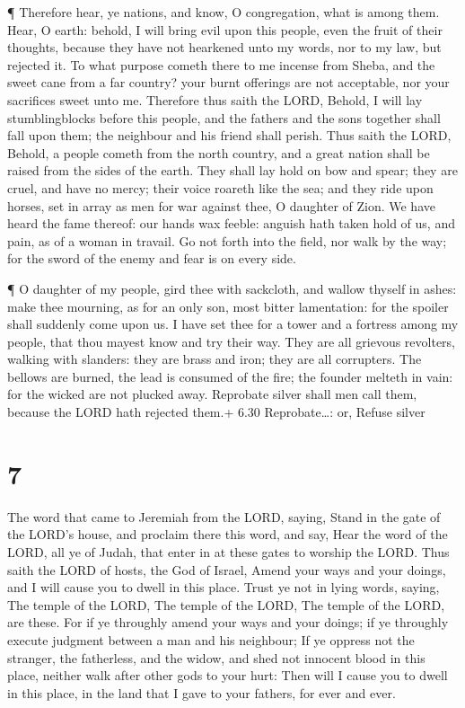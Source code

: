  ¶ Therefore hear, ye nations, and know, O congregation,
what is among them.  Hear, O earth: behold, I will bring
evil upon this people, even the fruit of their thoughts, because they
have not hearkened unto my words, nor to my law, but rejected it.
 To what purpose cometh there to me incense from Sheba, and
the sweet cane from a far country? your burnt offerings are not
acceptable, nor your sacrifices sweet unto me.  Therefore
thus saith the LORD, Behold, I will lay stumblingblocks before this
people, and the fathers and the sons together shall fall upon them; the
neighbour and his friend shall perish.  Thus saith the
LORD, Behold, a people cometh from the north country, and a great nation
shall be raised from the sides of the earth.  They shall
lay hold on bow and spear; they are cruel, and have no mercy; their
voice roareth like the sea; and they ride upon horses, set in array as
men for war against thee, O daughter of Zion.  We have
heard the fame thereof: our hands wax feeble: anguish hath taken hold of
us, and pain, as of a woman in travail.  Go not forth into
the field, nor walk by the way; for the sword of the enemy and fear is
on every side.

 ¶ O daughter of my people, gird thee with sackcloth, and
wallow thyself in ashes: make thee mourning, as for an only son, most
bitter lamentation: for the spoiler shall suddenly come upon us.
 I have set thee for a tower and a fortress among my
people, that thou mayest know and try their way.  They are
all grievous revolters, walking with slanders: they are brass and iron;
they are all corrupters.  The bellows are burned, the lead
is consumed of the fire; the founder melteth in vain: for the wicked are
not plucked away.  Reprobate silver shall men call them,
because the LORD hath rejected them.+ 6.30 Reprobate\ldots: or, Refuse
silver

\hypertarget{section-6}{%
\section{7}\label{section-6}}

 The word that came to Jeremiah from the LORD, saying,
 Stand in the gate of the LORD's house, and proclaim there
this word, and say, Hear the word of the LORD, all ye of Judah, that
enter in at these gates to worship the LORD.  Thus saith the
LORD of hosts, the God of Israel, Amend your ways and your doings, and I
will cause you to dwell in this place.  Trust ye not in
lying words, saying, The temple of the LORD, The temple of the LORD, The
temple of the LORD, are these.  For if ye throughly amend
your ways and your doings; if ye throughly execute judgment between a
man and his neighbour;  If ye oppress not the stranger, the
fatherless, and the widow, and shed not innocent blood in this place,
neither walk after other gods to your hurt:  Then will I
cause you to dwell in this place, in the land that I gave to your
fathers, for ever and ever.

